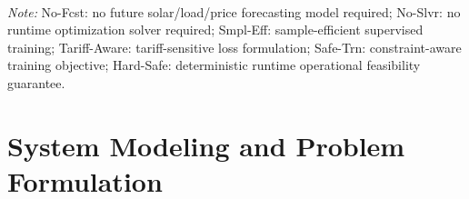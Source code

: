 \documentclass[journal]{IEEEtran}
\theoremstyle{remark}
\begin{document}
\begin{table}[!t]
\centering
\caption{Methodological Taxonomy and Feature Comparison of EV Charging Scheduling Paradigms}
\label{tab:taxonomy}
\vspace{1mm}\\
\raggedright\scriptsize{\textit{Note:} No-Fcst: no future solar/load/price forecasting model required; No-Slvr: no runtime optimization solver required; Smpl-Eff: sample-efficient supervised training; Tariff-Aware: tariff-sensitive loss formulation; Safe-Trn: constraint-aware training objective; Hard-Safe: deterministic runtime operational feasibility guarantee.}
\end{table}

\section{System Modeling and Problem Formulation}
\end{document}
